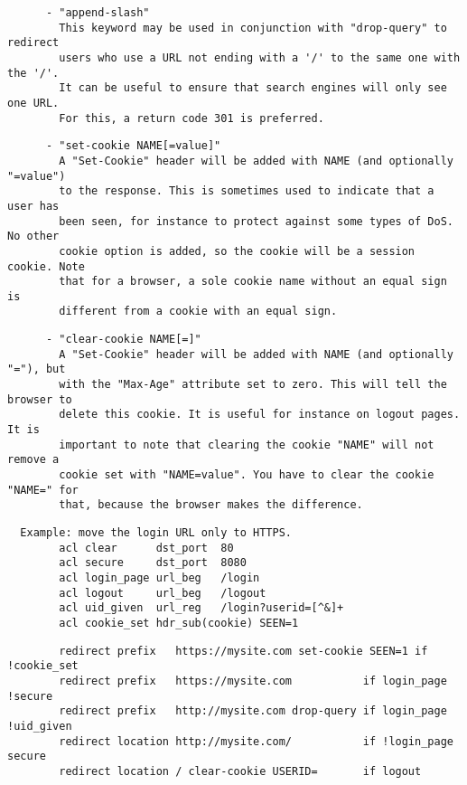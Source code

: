 \begin{verbatim}
      - "append-slash"
        This keyword may be used in conjunction with "drop-query" to redirect
        users who use a URL not ending with a '/' to the same one with the '/'.
        It can be useful to ensure that search engines will only see one URL.
        For this, a return code 301 is preferred.
\end{verbatim}

\begin{verbatim}
      - "set-cookie NAME[=value]"
        A "Set-Cookie" header will be added with NAME (and optionally "=value")
        to the response. This is sometimes used to indicate that a user has
        been seen, for instance to protect against some types of DoS. No other
        cookie option is added, so the cookie will be a session cookie. Note
        that for a browser, a sole cookie name without an equal sign is
        different from a cookie with an equal sign.
\end{verbatim}

\begin{verbatim}
      - "clear-cookie NAME[=]"
        A "Set-Cookie" header will be added with NAME (and optionally "="), but
        with the "Max-Age" attribute set to zero. This will tell the browser to
        delete this cookie. It is useful for instance on logout pages. It is
        important to note that clearing the cookie "NAME" will not remove a
        cookie set with "NAME=value". You have to clear the cookie "NAME=" for
        that, because the browser makes the difference.
\end{verbatim}

\begin{verbatim}
  Example: move the login URL only to HTTPS.
        acl clear      dst_port  80
        acl secure     dst_port  8080
        acl login_page url_beg   /login
        acl logout     url_beg   /logout
        acl uid_given  url_reg   /login?userid=[^&]+
        acl cookie_set hdr_sub(cookie) SEEN=1
\end{verbatim}

\begin{verbatim}
        redirect prefix   https://mysite.com set-cookie SEEN=1 if !cookie_set
        redirect prefix   https://mysite.com           if login_page !secure
        redirect prefix   http://mysite.com drop-query if login_page !uid_given
        redirect location http://mysite.com/           if !login_page secure
        redirect location / clear-cookie USERID=       if logout
\end{verbatim}

